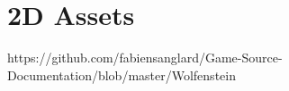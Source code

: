 \documentclass[book.tex]{subfiles}
\begin{document}
\section{2D Assets}
https://github.com/fabiensanglard/Game-Source-Documentation/blob/master/Wolfenstein%
\end{document}
